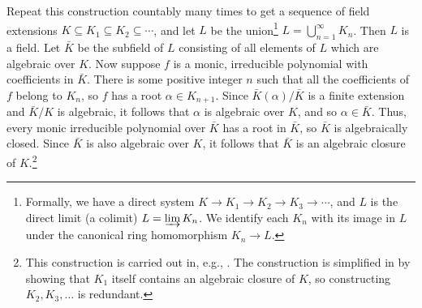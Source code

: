 \begin{solution}
Repeat this construction countably many times to get a sequence of field extensions \(K \subseteq K_1 \subseteq K_2 \subseteq \cdots\), and let \(L\) be the union\footnote{%
Formally, we have a direct system \(K \to K_1 \to K_2 \to K_3 \to \cdots\), and \(L\) is the direct limit (a colimit) \(L = \varinjlim K_n\).
We identify each \(K_n\) with its image in \(L\) under the canonical ring homomorphism \(K_n \to L\).
}
\(L = \bigcup_{n=1}^\infty K_n\).
Then \(L\) is a field.
Let \(\bar{K}\) be the subfield of \(L\) consisting of all elements of \(L\) which are algebraic over \(K\).
Now suppose \(f\) is a monic, irreducible polynomial with coefficients in \(\bar{K}\).
There is some positive integer \(n\) such that all the coefficients of \(f\) belong to \(K_n\), so \(f\) has a root \(\alpha \in K_{n+1}\).
Since \(\bar{K}(\alpha) / \bar{K}\) is a finite extension and \(\bar{K} / K\) is algebraic, it follows that \(\alpha\) is algebraic over \(K\), and so \(\alpha \in \bar{K}\).
Thus, every monic irreducible polynomial over \(\bar{K}\) has a root in \(\bar{K}\), so \(\bar{K}\) is algebraically closed.
Since \(\bar{K}\) is also algebraic over \(K\), it follows that \(\bar{K}\) is an algebraic closure of \(K\).\footnote{%
This construction is carried out in, e.g., \cite[Chapter V, Theorem 2.5 and Corollary 2.6]{LangAlgebra}.
The construction is simplified in \cite{GilmerAlgebraicClosure} by showing that \(K_1\) itself contains an algebraic closure of \(K\), so constructing \(K_2, K_3, \ldots\) is redundant.
}%
\end{solution}